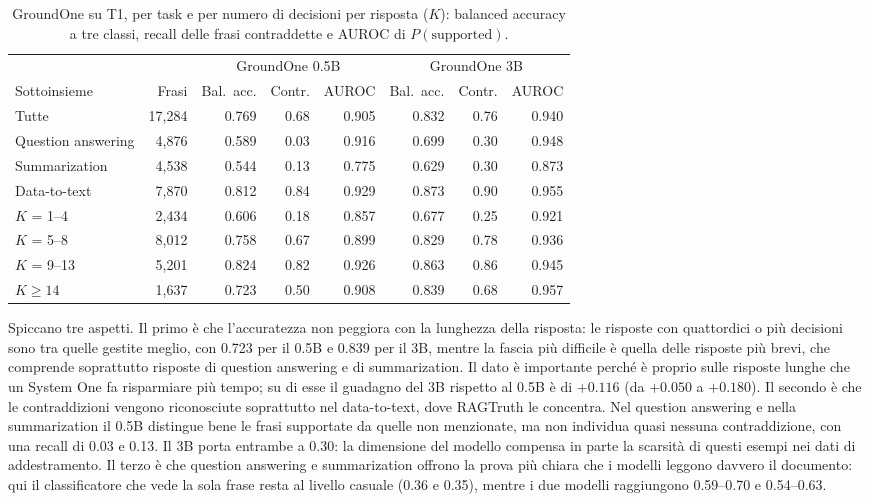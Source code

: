 \begin{table}[htbp]
\centering
\caption{GroundOne su T1, per task e per numero di decisioni per risposta ($K$): balanced accuracy a tre classi,
recall delle frasi contraddette e AUROC di $P(\text{supported})$.}
\label{tab:results-t1}
\small
\begin{adjustbox}{max width=\textwidth}
\begin{tabular}{@{}lrrrrrrr@{}}
\toprule
 & & \multicolumn{3}{c}{GroundOne 0.5B} & \multicolumn{3}{c}{GroundOne 3B} \\
\cmidrule(lr){3-5}\cmidrule(l){6-8}
Sottoinsieme & Frasi & Bal.\ acc. & Contr. & AUROC & Bal.\ acc. & Contr. & AUROC \\
\midrule
Tutte & 17{,}284 & 0.769 & 0.68 & 0.905 & 0.832 & 0.76 & 0.940 \\
\midrule
Question answering & 4{,}876 & 0.589 & 0.03 & 0.916 & 0.699 & 0.30 & 0.948 \\
Summarization & 4{,}538 & 0.544 & 0.13 & 0.775 & 0.629 & 0.30 & 0.873 \\
Data-to-text & 7{,}870 & 0.812 & 0.84 & 0.929 & 0.873 & 0.90 & 0.955 \\
\midrule
$K$ = 1--4 & 2{,}434 & 0.606 & 0.18 & 0.857 & 0.677 & 0.25 & 0.921 \\
$K$ = 5--8 & 8{,}012 & 0.758 & 0.67 & 0.899 & 0.829 & 0.78 & 0.936 \\
$K$ = 9--13 & 5{,}201 & 0.824 & 0.82 & 0.926 & 0.863 & 0.86 & 0.945 \\
$K \geq 14$ & 1{,}637 & 0.723 & 0.50 & 0.908 & 0.839 & 0.68 & 0.957 \\
\bottomrule
\end{tabular}
\end{adjustbox}
\end{table}

Spiccano tre aspetti. Il primo è che l'accuratezza non peggiora con la lunghezza della risposta: le risposte con
quattordici o più decisioni sono tra quelle gestite meglio, con 0.723 per il 0.5B e 0.839 per il 3B, mentre la fascia
più difficile è quella delle risposte più brevi, che comprende soprattutto risposte di question answering e di
summarization. Il dato è importante perché è proprio sulle risposte lunghe che un System One fa risparmiare più tempo;
su di esse il guadagno del 3B rispetto al 0.5B è di $+0.116$ (da $+0.050$ a $+0.180$). Il secondo è che le
contraddizioni vengono riconosciute soprattutto nel data-to-text, dove RAGTruth le concentra. Nel question answering e
nella summarization il 0.5B distingue bene le frasi supportate da quelle non menzionate, ma non individua quasi nessuna
contraddizione, con una recall di 0.03 e 0.13. Il 3B porta entrambe a 0.30: la dimensione del modello compensa in parte
la scarsità di questi esempi nei dati di addestramento. Il terzo è che question answering e summarization offrono la
prova più chiara che i modelli leggono davvero il documento: qui il classificatore che vede la sola frase resta al
livello casuale (0.36 e 0.35), mentre i due modelli raggiungono 0.59--0.70 e 0.54--0.63.

